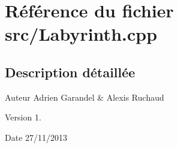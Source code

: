 \section{Référence du fichier src/\-Labyrinth.cpp}
\label{_labyrinth_8cpp}


\subsection{Description détaillée}
\begin{DoxyAuthor}{Auteur}
Adrien Garandel \& Alexis Ruchaud 
\end{DoxyAuthor}
\begin{DoxyVersion}{Version}
1. 
\end{DoxyVersion}
\begin{DoxyDate}{Date}
27/11/2013 
\end{DoxyDate}
